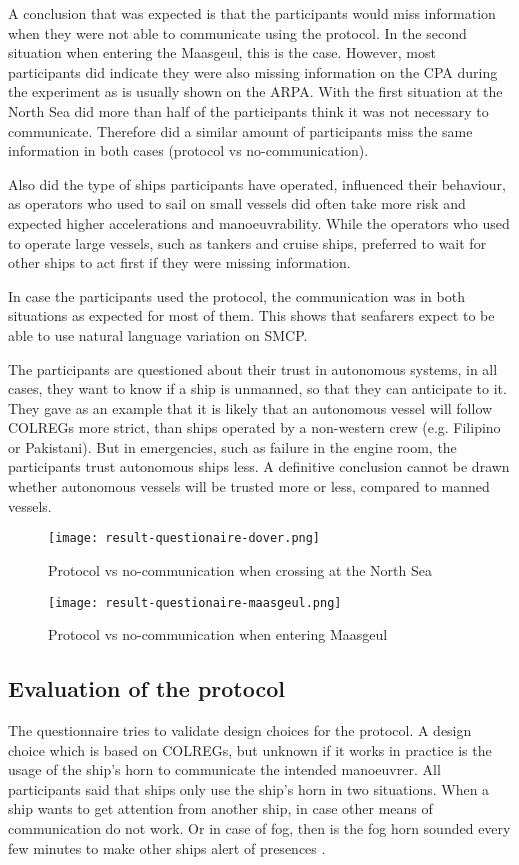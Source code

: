 A conclusion that was expected is that the participants would miss information when they were not able to communicate using the protocol. In the second situation when entering the Maasgeul, this is the case. However, most participants did indicate they were also missing information on the \ac{CPA} during the experiment as is usually shown on the \ac{ARPA}. With the first situation at the North Sea did more than half of the participants think it was not necessary to communicate. Therefore did a similar amount of participants miss the same information in both cases (protocol vs no-communication).

Also did the type of ships participants have operated, influenced their behaviour, as operators who used to sail on small vessels did often take more risk and expected higher accelerations and manoeuvrability. While the operators who used to operate large vessels, such as tankers and cruise ships, preferred to wait for other ships to act first if they were missing information.

In case the participants used the protocol, the communication was in both situations as expected for most of them. This shows that seafarers expect to be able to use natural language variation on \ac{SMCP}.

The participants are questioned about their trust in autonomous systems, in all cases, they want to know if a ship is unmanned, so that they can anticipate to it. They gave as an example that it is likely that an autonomous vessel will follow COLREGs more strict, than ships operated by a non-western crew (e.g. Filipino or Pakistani). But in emergencies, such as failure in the engine room, the participants trust autonomous ships less. A definitive conclusion cannot be drawn whether autonomous vessels will be trusted more or less, compared to manned vessels.

\begin{figure}[p]
	\centering
	\texttt{[image: result-questionaire-dover.png]}
	\caption{Protocol vs no-communication when crossing at the North Sea}
	\label{fig:sq-dover}
\end{figure}

\begin{figure}[p]
	\centering
	\texttt{[image: result-questionaire-maasgeul.png]}
	\caption{Protocol vs no-communication when entering Maasgeul}
	\label{fig:sq-maasgeul}
\end{figure}


\subsection{Evaluation of the protocol}
The questionnaire tries to validate design choices for the protocol. A design choice which is based on COLREGs, but unknown if it works in practice is the usage of the ship's horn to communicate the intended manoeuvrer. All participants said that ships only use the ship's horn in two situations. When a ship wants to get attention from another ship, in case other means of communication do not work. Or in case of fog, then is the fog horn sounded every few minutes to make other ships alert of presences \cite{IMO1972}.

